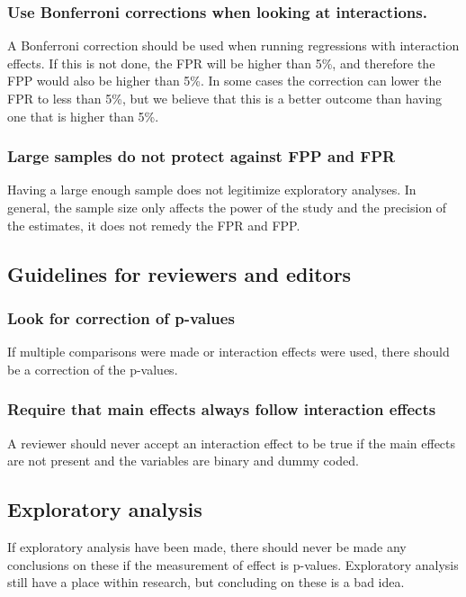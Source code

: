 \subsubsection{Use Bonferroni corrections when looking at interactions.}
A Bonferroni correction should be used when running regressions with interaction effects. If this is not done, the FPR will be higher than 5\%, and therefore the FPP would also be higher than 5\%. In some cases the correction can lower the FPR to less than 5\%, but we believe that this is a better outcome than having one that is higher than 5\%. 
\subsubsection{Large samples do not protect against FPP and FPR}
Having a large enough sample does not legitimize exploratory analyses. In general, the sample size only affects the power of the study and the precision of the estimates, it does not remedy the FPR and FPP. 

\subsection{Guidelines for reviewers and editors}

\subsubsection{Look for correction of p-values}
If multiple comparisons were made or interaction effects were used, there should be a correction of the p-values.
\subsubsection{Require that main effects always follow interaction effects}
A reviewer should never accept an interaction effect to be true if the main effects are not present and the variables are binary and dummy coded. 
\subsection{Exploratory analysis}
If exploratory analysis have been made, there should never be made any conclusions on these if the measurement of effect is p-values. Exploratory analysis still have a place within research, but concluding on these is a bad idea.  


